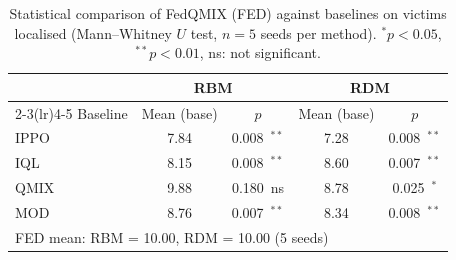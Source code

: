 \begin{table}[t]
\centering
\caption{Statistical comparison of FedQMIX (FED) against baselines on victims
localised (Mann--Whitney $U$ test, $n=5$ seeds per method).
$^{*}p<0.05$, $^{**}p<0.01$, ns: not significant.}
\label{tab:significance}
\small
\begin{tabular}{lcccc}
\toprule
 & \multicolumn{2}{c}{\textbf{RBM}} & \multicolumn{2}{c}{\textbf{RDM}} \\
\cmidrule(lr){2-3}\cmidrule(lr){4-5}
Baseline & Mean (base) & $p$ & Mean (base) & $p$ \\
\midrule
IPPO & 7.84 & 0.008~$^{**}$ & 7.28 & 0.008~$^{**}$ \\
IQL & 8.15 & 0.008~$^{**}$ & 8.60 & 0.007~$^{**}$ \\
QMIX & 9.88 & 0.180~ns & 8.78 & 0.025~$^{*}$ \\
MOD & 8.76 & 0.007~$^{**}$ & 8.34 & 0.008~$^{**}$ \\
\midrule
\multicolumn{5}{l}{FED mean: RBM = 10.00, RDM = 10.00 (5 seeds)} \\
\bottomrule
\end{tabular}
\end{table}
